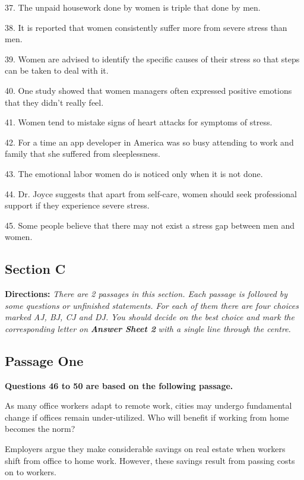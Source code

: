 \documentclass[UTF8,11pt]{ctexart}
\begin{document}
37. The unpaid housework done by women is triple that done by men.


38. It is reported that women consistently suffer more from severe stress than men.


39. Women are advised to identify the specific causes of their stress so that steps can be taken to deal with it.


40. One study showed that women managers often expressed positive emotions that they didn't really feel.


41. Women tend to mistake signs of heart attacks for symptoms of stress.


42. For a time an app developer in America was so busy attending to work and family that she suffered from sleeplessness.


43. The emotional labor women do is noticed only when it is not done.


44. Dr. Joyce suggests that apart from self-care, women should seek professional support if they experience severe stress.


45. Some people believe that there may not exist a stress gap between men and women.


\subsection*{\textbf{Section C}}


\textbf{Directions: }\textit{There are 2 passages in this section. Each passage is followed by some questions} \textit{or unfinished statements. For each of them there are four choices marked AJ, BJ, CJ and DJ.} \textit{You should decide on the best choice and mark the corresponding letter on }\textbf{\textit{Answer Sheet 2}} \textit{with a single line through the centre.}


\subsection*{\textbf{Passage One}}


\textbf{Questions 46 to 50 are based on the following passage.}


As many office workers adapt to remote work, cities may undergo fundamental change if offices remain under-utilized. Who will benefit if working from home becomes the norm?


Employers argue they make considerable savings on real estate when workers shift from office to home work. However, these savings result from passing costs on to workers.
\end{document}
